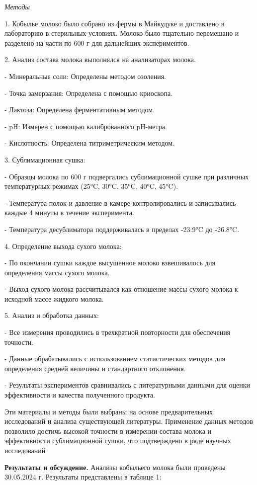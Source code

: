 \emph{Методы}

1. Кобылье молоко было собрано из фермы в Майкудуке и доставлено в
лабораторию в стерильных условиях. Молоко было тщательно перемешано и
разделено на части по 600 г для дальнейших экспериментов.

2. Анализ состава молока выполнялся на анализаторах молока.

- Минеральные соли: Определены методом озоления.

- Точка замерзания: Определена с помощью криоскопа.

- Лактоза: Определена ферментативным методом.

- pH: Измерен с помощью калиброванного pH-метра.

- Кислотность: Определена титриметрическим методом.

3. Сублимационная сушка:

- Образцы молока по 600 г подвергались сублимационной сушке при
различных температурных режимах (25°C, 30°C, 35°C, 40°C, 45°C).

- Температура полок и давление в камере контролировались и записывались
каждые 4 минуты в течение эксперимента.

- Температура десублиматора поддерживалась в пределах -23.9°C до
-26.8°C.

4. Определение выхода сухого молока:

- По окончании сушки каждое высушенное молоко взвешивалось для
определения массы сухого молока.

- Выход сухого молока рассчитывался как отношение массы сухого молока к
исходной массе жидкого молока.

5. Анализ и обработка данных:

- Все измерения проводились в трехкратной повторности для обеспечения
точности.

- Данные обрабатывались с использованием статистических методов для
определения средней величины и стандартного отклонения.

- Результаты экспериментов сравнивались с литературными данными для
оценки эффективности и качества полученного продукта.

Эти материалы и методы были выбраны на основе предварительных
исследований и анализа существующей литературы. Применение данных
методов позволило достичь высокой точности в измерении состава молока и
эффективности сублимационной сушки, что подтверждено в ряде научных
исследований

{\bfseries Результаты и обсуждение.} Анализы кобыльего молока были
проведены 30.05.2024 г. Результаты представлены в таблице 1:


